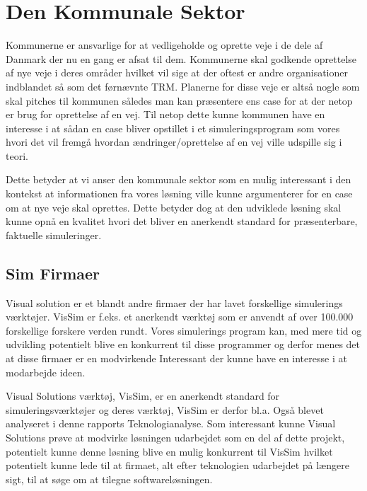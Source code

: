 \section {Den Kommunale Sektor}
Kommunerne er ansvarlige for at vedligeholde og oprette veje i de dele af Danmark der nu en gang er afsat til dem. Kommunerne skal godkende oprettelse af nye veje i deres områder hvilket vil sige at der oftest er andre organisationer indblandet så som det førnævnte TRM. Planerne for disse veje er altså nogle som skal pitches til kommunen således man kan præsentere ens case for at der netop er brug for oprettelse af en vej. Til netop dette kunne kommunen have en interesse i at sådan en case bliver opstillet i et simuleringsprogram som vores hvori det vil fremgå hvordan ændringer/oprettelse af en vej ville udspille sig i teori.

\vspace{5mm}

Dette betyder at vi anser den kommunale sektor som en mulig interessant i den kontekst at informationen fra vores løsning ville kunne argumenterer for en case om at nye veje skal oprettes. Dette betyder dog at den udviklede løsning skal kunne opnå en kvalitet hvori det bliver en anerkendt standard for præsenterbare, faktuelle simuleringer.

\subsection{Sim Firmaer}
Visual solution er et blandt andre firmaer der har lavet forskellige simulerings værktøjer. VisSim er f.eks. et anerkendt værktøj som er anvendt af over 100.000 forskellige forskere verden rundt\cite{VisualSolutions}.
Vores simulerings program kan, med mere tid og udvikling potentielt blive en konkurrent til disse programmer og derfor menes det at disse firmaer er en modvirkende Interessant der kunne have en interesse i at modarbejde ideen.

\vspace{5mm}

Visual Solutions værktøj, VisSim, er en anerkendt standard for simuleringsværktøjer og deres værktøj, VisSim er derfor bl.a. Også blevet analyseret i denne rapports Teknologianalyse. Som interessant kunne Visual Solutions prøve at modvirke løsningen udarbejdet som en del af dette projekt, potentielt kunne denne løsning blive en mulig konkurrent til VisSim hvilket potentielt kunne lede til at firmaet, alt efter teknologien udarbejdet på længere sigt, til at søge om at tilegne softwareløsningen.

